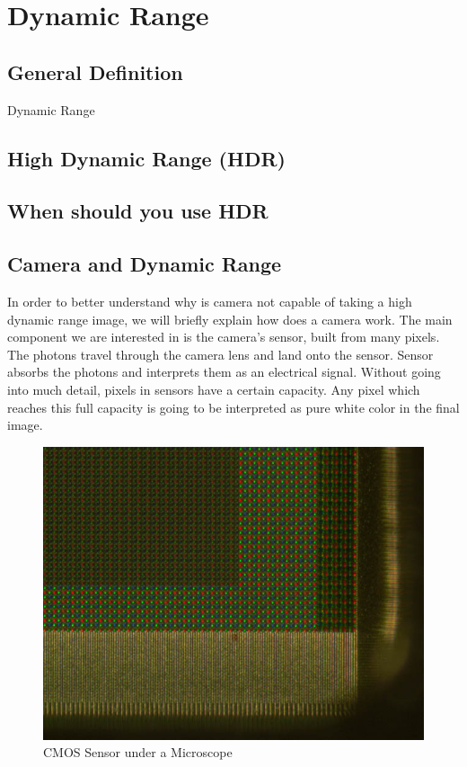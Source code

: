 \documentclass{article}
\begin{document}
\section{Dynamic Range} %

\subsection{General Definition}
Dynamic Range 

\subsection{High Dynamic Range (HDR)}

\subsection{When should you use HDR}

\subsection{Camera and Dynamic Range}
In order to better understand why is camera not capable of taking a high dynamic range image, we will briefly explain how does a camera work. 
The main component we are interested in is the camera's sensor, built from many pixels.
The photons travel through the camera lens and land onto the sensor. 
Sensor absorbs the photons and interprets them as an electrical signal.
Without going into much detail, pixels in sensors have a certain capacity. Any pixel which reaches this full capacity is going to be interpreted as pure white color in the final image.
\begin{figure}[H]
    \centering
    \includegraphics[width = 1.0\linewidth]{images/cmosmicrograph-2.jpg}
    \caption{CMOS Sensor under a Microscope \cite{sensor:Array}}
    \label{fig:sensorArray}
\end{figure}
\end{document}
